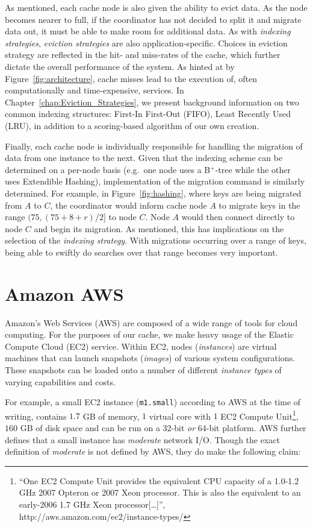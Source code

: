 As mentioned, each cache node is also given the ability to evict data. As the
node becomes nearer to full, if the coordinator has not decided to split it
and migrate data out, it must be able to make room for additional data. As with
\emph{indexing strategies}, \emph{eviction strategies} are also
application-specific. Choices in eviction strategy are reflected in the hit-
and miss-rates of the cache, which further dictate the overall performance of
the system. As hinted at by Figure~\ref{fig:architecture}, cache misses lead to
the execution of, often computationally and time-expensive, services. In
Chapter~\ref{chap:Eviction_Strategies}, we present background information on two
common indexing structures: First-In First-Out (FIFO), Least Recently Used
(LRU), in addition to a scoring-based algorithm of our own creation.

Finally, each cache node is individually responsible for handling the migration
of data from one instance to the next. Given that the indexing scheme can be
determined on a per-node basis (e.g.\ one node uses a B$^+$-tree while the
other uses Extendible Hashing), implementation of the migration command is
similarly determined. For example, in Figure~\ref{fig:hashing}, where keys are
being migrated from $A$ to $C$, the coordinator would inform cache node $A$ to
migrate keys in the range $(75,(75 + 8 + r)/2]$ to node $C$. Node $A$ would
then connect directly to node $C$ and begin its migration. As mentioned, this
has implications on the selection of the \emph{indexing strategy}. With
migrations occurring over a range of keys, being able to swiftly do searches
over that range becomes very important.


\section{Amazon AWS} %
\label{sec:Amazon_AWS}
Amazon's Web Services (AWS) are composed of a wide range of tools for cloud
computing. For the purposes of our cache, we make heavy usage of the Elastic
Compute Cloud (EC2) service. Within EC2, nodes (\emph{instances}) are virtual
machines that can launch snapshots (\emph{images}) of various system
configurations. These snapshots can be loaded onto a number of different
\emph{instance types} of varying capabilities and costs.

For example, a small EC2 instance ({\tt m1.small}) according to
AWS\cite{amazonEC2InstanceTypes} at the time of writing, contains $1.7$ GB of
memory, $1$ virtual core with $1$ EC2 Compute Unit\footnote{``One EC2 Compute
  Unit provides the equivalent CPU capacity of a 1.0-1.2 GHz 2007 Opteron or
2007 Xeon processor. This is also the equivalent to an early-2006 1.7 GHz Xeon
processor[\ldots]'', http://aws.amazon.com/ec2/instance-types/}, $160$ GB of
disk space and can be run on a $32$-bit \emph{or} $64$-bit platform. AWS
further defines that a small instance has \emph{moderate} network I/O. Though
the exact definition of \emph{moderate} is not defined by AWS, they do make the
following claim\cite{amazonEC2InstanceTypes}:

